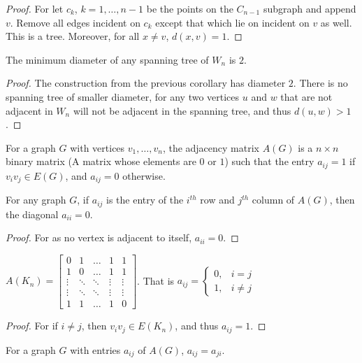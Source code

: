 \documentclass[crop=false,class=book]{standalone}
\begin{document}
\begin{proof}
For let $c_k$, $k=1,\hdots,n-1$ be the points on the $C_{n-1}$ subgraph and append $v$. Remove all edges incident on $c_k$ except that which lie on incident on $v$ as well. This is a tree. Moreover, for all $x\ne v$, $d(x,v) = 1$.
\end{proof}
\begin{corollary}
The minimum diameter of any spanning tree of $W_n$ is $2$.
\end{corollary}
\begin{proof}
The construction from the previous corollary has diameter $2$. There is no spanning tree of smaller diameter, for any two vertices $u$ and $w$ that are not adjacent in $W_n$ will not be adjacent in the spanning tree, and thus $d(u,w)>1$.
\end{proof}
\begin{definition}
For a graph $G$ with vertices $v_1,\hdots, v_n$, the adjacency matrix $A(G)$ is a $n\times n$ binary matrix (A matrix whose elements are $0$ or $1$) such that the entry $a_{ij}= 1$ if $v_i v_j \in E(G)$, and $a_{ij}=0$ otherwise.
\end{definition}
\begin{corollary}
For any graph $G$, if $a_{ij}$ is the entry of the $i^{th}$ row and $j^{th}$ column of $A(G)$, then the diagonal $a_{ii} = 0$.
\end{corollary}
\begin{proof}
For as no vertex is adjacent to itself, $a_{ii}=0$.
\end{proof}
\begin{corollary}
$A(K_n) = \begin{bmatrix} 0 & 1 &  \hdots & 1 & 1 \\ 1 & 0 & \hdots & 1 & 1 \\ \vdots & \ddots & \ddots & \vdots & \vdots \\ \vdots & \ddots & \ddots & \vdots & \vdots \\ 1 & 1 & \hdots & 1 & 0 \end{bmatrix}$. That is $a_{ij} = \begin{cases} 0, & i=j \\ 1, & i\ne j\end{cases}$
\end{corollary}
\begin{proof}
For if $i\ne j$, then $v_iv_j \in E(K_n)$, and thus $a_{ij}=1$.
\end{proof}
\begin{corollary}
For a graph $G$ with entries $a_{ij}$ of $A(G)$, $a_{ij} = a_{ji}$.
\end{corollary}
\end{document}

